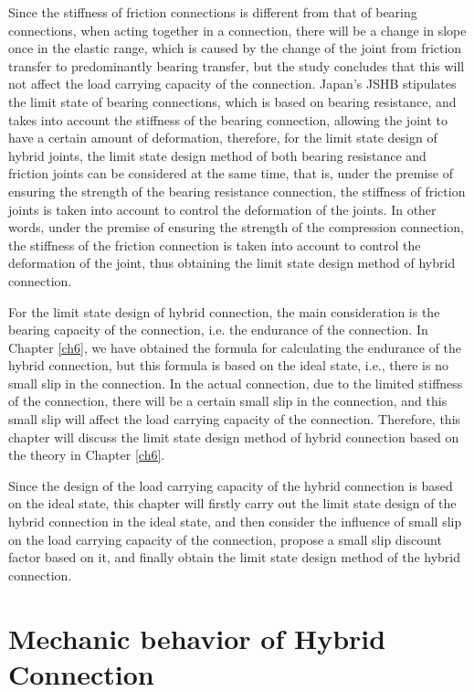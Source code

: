 Since the stiffness of friction connections is different from that of bearing connections, when acting together in a connection, there will be a change in slope once in the elastic range, which is caused by the change of the joint from friction transfer to predominantly bearing transfer, but the study concludes that this will not affect the load carrying capacity of the connection. Japan's JSHB stipulates the limit state of bearing connections, which is based on bearing resistance, and takes into account the stiffness of the bearing connection, allowing the joint to have a certain amount of deformation, therefore, for the limit state design of hybrid joints, the limit state design method of both bearing resistance and friction joints can be considered at the same time, that is, under the premise of ensuring the strength of the bearing resistance connection, the stiffness of friction joints is taken into account to control the deformation of the joints. In other words, under the premise of ensuring the strength of the compression connection, the stiffness of the friction connection is taken into account to control the deformation of the joint, thus obtaining the limit state design method of hybrid connection.

For the limit state design of hybrid connection, the main consideration is the bearing capacity of the connection, i.e. the endurance of the connection. In Chapter \ref{ch6}, we have obtained the formula for calculating the endurance of the hybrid connection, but this formula is based on the ideal state, i.e., there is no small slip in the connection. In the actual connection, due to the limited stiffness of the connection, there will be a certain small slip in the connection, and this small slip will affect the load carrying capacity of the connection. Therefore, this chapter will discuss the limit state design method of hybrid connection based on the theory in Chapter \ref{ch6}.

Since the design of the load carrying capacity of the hybrid connection is based on the ideal state, this chapter will firstly carry out the limit state design of the hybrid connection in the ideal state, and then consider the influence of small slip on the load carrying capacity of the connection, propose a small slip discount factor based on it, and finally obtain the limit state design method of the hybrid connection.

\section{Mechanic behavior of Hybrid Connection}

